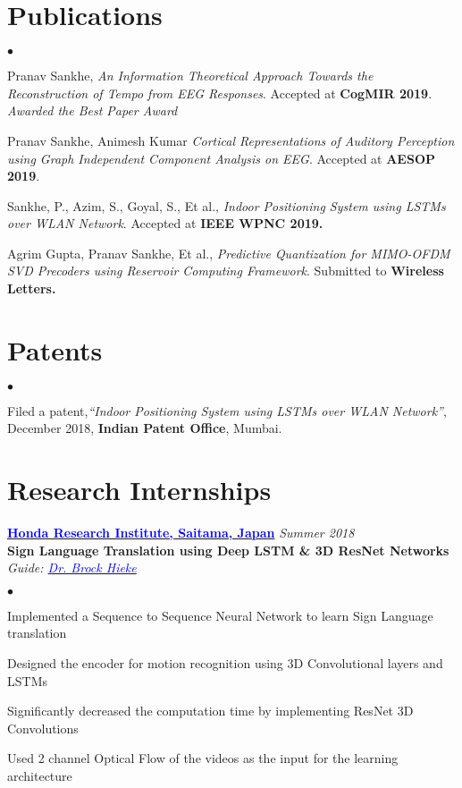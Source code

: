 \documentclass[margin,line, 9pt]{res}
\newenvironment{list2}{
  \begin{list}{$\bullet$}{%
      \setlength{\itemsep}{0.03in}
      \setlength{\parsep}{0in} \setlength{\parskip}{0in}
      \setlength{\topsep}{0in} \setlength{\partopsep}{0in} 
      \setlength{\leftmargin}{0.2in}}}{\end{list}}
\begin{document}
\begin{resume}
\section{\sc Publications}
\begin{list2}
\item Pranav Sankhe, {\em An Information Theoretical Approach Towards the Reconstruction of Tempo from EEG Responses}. Accepted at \textbf{CogMIR 2019}. \emph{Awarded the Best Paper Award}
%
\item Pranav Sankhe, Animesh Kumar {\em Cortical Representations of Auditory Perception using Graph Independent Component Analysis on EEG}. Accepted at \textbf{AESOP 2019}.
%
\item Sankhe, P., Azim, S., Goyal, S., Et al., {\em Indoor Positioning System using LSTMs over WLAN Network}. Accepted at \textbf{IEEE WPNC 2019.}
%
\item Agrim Gupta, Pranav Sankhe, Et al., {\em Predictive Quantization for MIMO-OFDM SVD Precoders using Reservoir Computing Framework}. Submitted to \textbf{Wireless Letters.}
%
%
\end{list2}
%
\section{\sc Patents}
\begin{list2}
\item {Filed a patent,\em “Indoor Positioning System using LSTMs over WLAN Network”}, December 2018, \textbf{Indian Patent Office}, Mumbai.
%
\end{list2}

\section{\sc Research Internships}

{\bf  \href{http://www.jp.honda-ri.com/en/}{\textcolor{blue}{Honda Research Institute, Saitama, Japan}} } \hfill {\it Summer 2018} \\
\textbf{Sign Language Translation using Deep LSTM \& 3D ResNet Networks} \\
{\em Guide: \href{https://www.researchgate.net/profile/Heike_Brock}{\textcolor{blue}{Dr. Brock Hieke}}}  \\
\vspace*{-.13in}
\begin{list2}
\item Implemented a Sequence to Sequence Neural Network to learn Sign Language translation 
\item Designed the encoder for motion recognition using 3D Convolutional layers and LSTMs
\item Significantly decreased the computation time by implementing ResNet 3D Convolutions
\item Used 2 channel Optical Flow of the videos as the input for the learning architecture
\end{list2}
% 

\end{resume}
\end{document}
